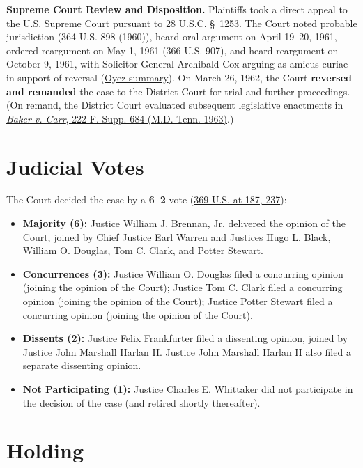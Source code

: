 \documentclass[12pt]{article}
\begin{document}
\textbf{Supreme Court Review and Disposition.} Plaintiffs took a direct appeal to the U.S. Supreme Court pursuant to 28 U.S.C. \S~1253. The Court noted probable jurisdiction (364 U.S. 898 (1960)), heard oral argument on April 19--20, 1961, ordered reargument on May 1, 1961 (366 U.S. 907), and heard reargument on October 9, 1961, with Solicitor General Archibald Cox arguing as amicus curiae in support of reversal (\href{https://www.oyez.org/cases/1960/6}{Oyez summary}). On March 26, 1962, the Court \textbf{reversed and remanded} the case to the District Court for trial and further proceedings. (On remand, the District Court evaluated subsequent legislative enactments in \href{https://law.justia.com/cases/federal/district-courts/FSupp/222/684/2009237/}{\textit{Baker v. Carr}, 222 F. Supp. 684 (M.D. Tenn. 1963)}.)

\section{Judicial Votes}

The Court decided the case by a \textbf{6--2} vote (\href{https://supreme.justia.com/cases/federal/us/369/186/}{369 U.S. at 187, 237}):

\begin{itemize}
  \item \textbf{Majority (6):} Justice William J. Brennan, Jr. delivered the opinion of the Court, joined by Chief Justice Earl Warren and Justices Hugo L. Black, William O. Douglas, Tom C. Clark, and Potter Stewart.
  \item \textbf{Concurrences (3):} Justice William O. Douglas filed a concurring opinion (joining the opinion of the Court); Justice Tom C. Clark filed a concurring opinion (joining the opinion of the Court); Justice Potter Stewart filed a concurring opinion (joining the opinion of the Court).
  \item \textbf{Dissents (2):} Justice Felix Frankfurter filed a dissenting opinion, joined by Justice John Marshall Harlan II. Justice John Marshall Harlan II also filed a separate dissenting opinion.
  \item \textbf{Not Participating (1):} Justice Charles E. Whittaker did not participate in the decision of the case (and retired shortly thereafter).
\end{itemize}

\section{Holding}
\end{document}
